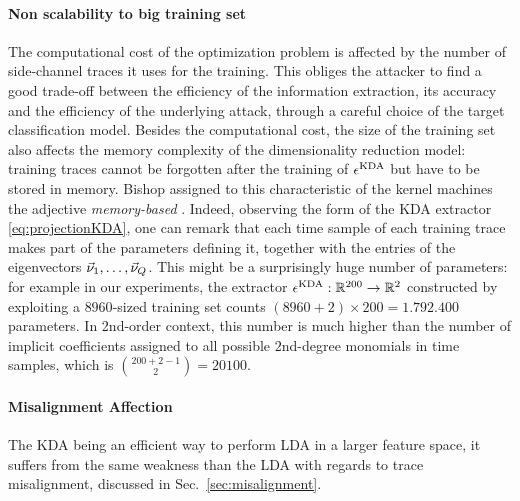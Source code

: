 \paragraph*{Non scalability to big training set} The computational cost of the optimization problem is affected by the number of side-channel traces it uses for the training. This obliges the attacker to find a good trade-off between the efficiency of the information extraction, its accuracy and the efficiency of the underlying attack, through a careful choice of the target classification model. Besides the computational cost, the size of the training set also affects the memory complexity of the dimensionality reduction model: training traces cannot be forgotten after the training of $\epsilon^{\mathrm{KDA}}$ but have to be stored in memory. Bishop assigned to this characteristic of the kernel machines the adjective \emph{memory-based} \cite[Chapter~6]{christopher2006pattern}. Indeed, observing the form of the KDA extractor \eqref{eq:projectionKDA}, one can remark that each time sample of each training trace makes part of the parameters defining it, together with the entries of the eigenvectors $\vec{\nu}_1, \dots, \vec{\nu}_Q$. This might be a surprisingly huge number of parameters: for example in our experiments, the extractor $\epsilon^{\mathrm{KDA}}:\mathbb{R}^{200}\rightarrow\mathbb{R}^2$ constructed by exploiting a $8960$-sized training set counts $(8960+2)\times200 = 1.792.400$ parameters. In 2nd-order context, this number is much higher than the number of implicit coefficients assigned to all possible $2$nd-degree monomials in time samples, which is ${{200+2-1}\choose{2}} = 20100$.

\paragraph*{Misalignment Affection} The KDA being an efficient way to perform LDA in a larger feature space, it suffers from the same weakness than the LDA with regards to trace misalignment, discussed in Sec.~\ref{sec:misalignment}.  
